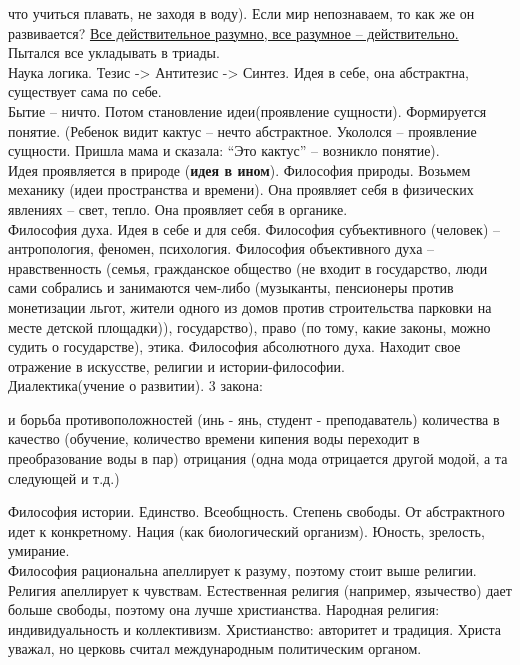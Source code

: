 \documentclass[a4paper,12pt]{report} %
\begin{document}
\begin{itemize}
  что учиться плавать, не заходя в воду). Если мир непознаваем,
  то как же он развивается? \underline{Все действительное разумно, все
    разумное -- действительно.} Пытался все укладывать в триады.\\
  Наука логика. Тезис -> Антитезис -> Синтез. Идея в себе, она
  абстрактна, существует сама по себе.\\
  Бытие -- ничто. Потом становление идеи(проявление сущности). Формируется понятие. (Ребенок
  видит кактус -- нечто абстрактное. Укололся -- проявление
  сущности. Пришла мама и сказала: ``Это кактус'' -- возникло
  понятие).\\
  Идея проявляется в природе (\textbf{идея в ином}). Философия
  природы. Возьмем механику (идеи пространства и времени). Она проявляет
  себя в физических явлениях -- свет, тепло. Она проявляет себя в
  органике.\\
  Философия духа. Идея в себе и для себя. Философия субъективного
  (человек) -- антропология, феномен, психология. Философия объективного
  духа -- нравственность (семья, гражданское общество (не входит в
  государство, люди сами собрались и занимаются чем-либо (музыканты,
  пенсионеры против монетизации льгот, жители одного из домов против строительства парковки на
  месте детской площадки)), государство), право (по тому, какие законы,
  можно судить о государстве), этика. Философия абсолютного
  духа. Находит свое отражение в искусстве, религии и
  истории-философии.\\
  Диалектика(учение о развитии). 3 закона:
  \begin{enumerate}
   и борьба противоположностей (инь - янь, студент - преподаватель)
   количества в качество (обучение, количество времени
    кипения воды переходит в преобразование воды в пар)
   отрицания (одна мода отрицается другой модой, а та
    следующей и т.д.)
  \end{enumerate}
  Философия истории. Единство. Всеобщность. Степень свободы. От
  абстрактного идет к конкретному. Нация (как биологический
  организм). Юность, зрелость, умирание.\\
  Философия рациональна апеллирует к разуму, поэтому стоит выше
  религии. Религия апеллирует к чувствам. Естественная религия
  (например, язычество) дает больше свободы, поэтому она лучше
  христианства. Народная религия: индивидуальность и
  коллективизм. Христианство: авторитет и традиция. Христа уважал, но церковь считал международным
  политическим органом.\\

\end{itemize}
\end{document}

